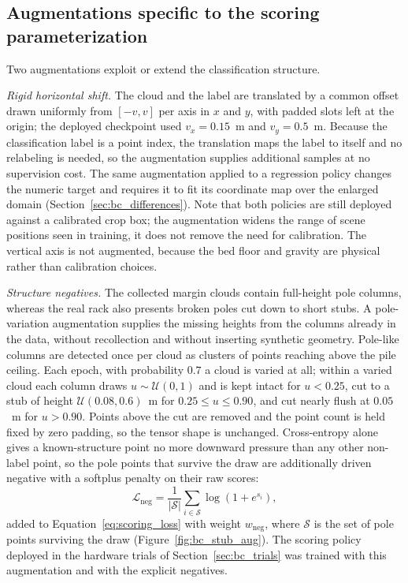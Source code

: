 \subsection{Augmentations specific to the scoring parameterization}
\label{sec:bc_scoring_aug}

Two augmentations exploit or extend the classification structure.

\emph{Rigid horizontal shift.} The cloud and the label are translated by a
common offset drawn uniformly from $[-v, v]$ per axis in $x$ and $y$, with
padded slots left at the origin; the deployed checkpoint used
$v_x = 0.15$~m and $v_y = 0.5$~m. Because the classification label is a
point index, the translation maps the label to itself and no relabeling is
needed, so the augmentation supplies additional samples at no supervision
cost. The same augmentation applied to a regression policy changes the
numeric target and requires it to fit its coordinate map over the enlarged
domain (Section~\ref{sec:bc_differences}). Note that both policies are still
deployed against a calibrated crop box; the augmentation widens the range of
scene positions seen in training, it does not remove the need for
calibration. The vertical axis is not
augmented, because the bed floor and gravity are physical rather than
calibration choices.

\emph{Structure negatives.} The collected margin clouds contain full-height
pole columns, whereas the real rack also presents broken poles cut down to
short stubs. A pole-variation augmentation supplies the missing heights from
the columns already in the data, without recollection and without inserting
synthetic geometry. Pole-like columns are detected once per cloud as
clusters of points reaching above the pile ceiling. Each epoch, with
probability $0.7$ a cloud is varied at all; within a varied cloud each column
draws $u \sim \mathcal{U}(0,1)$ and is kept intact for $u < 0.25$, cut to a
stub of height $\mathcal{U}(0.08, 0.6)$~m for $0.25 \le u \le 0.90$, and cut
nearly flush at $0.05$~m for $u > 0.90$. Points above the cut are removed and
the point count is held fixed by zero padding, so the tensor shape is
unchanged. Cross-entropy alone gives a known-structure point no more downward
pressure than any other non-label point, so the pole points that survive the
draw are additionally driven negative with a softplus penalty on their raw
scores:
\begin{equation}
  \mathcal{L}_{\mathrm{neg}} = \frac{1}{|\mathcal{S}|} \sum_{i \in \mathcal{S}}
  \log\!\left( 1 + e^{s_i} \right),
\end{equation}
added to Equation~\eqref{eq:scoring_loss} with weight $w_{\mathrm{neg}}$,
where $\mathcal{S}$ is the set of pole points surviving the draw
(Figure~\ref{fig:bc_stub_aug}). The scoring policy deployed in the hardware
trials of Section~\ref{sec:bc_trials} was trained with this augmentation and
with the explicit negatives.


